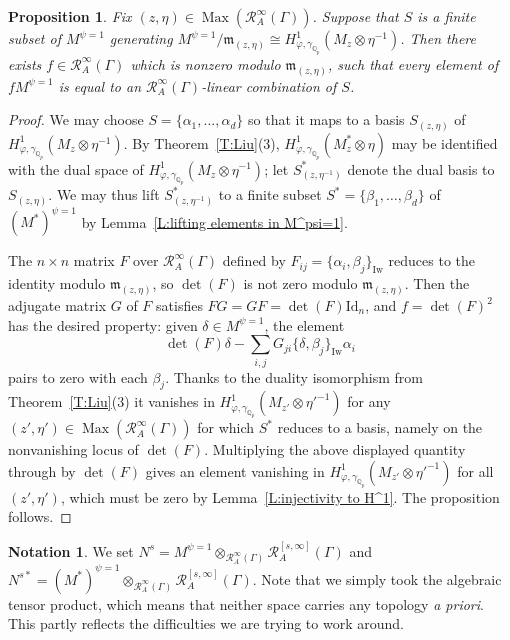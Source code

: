 \documentclass[12pt]{article}
\newtheorem{prop}[theorem]{Proposition}
\theoremstyle{definition}
\newtheorem{notation}[theorem]{Notation}
\numberwithin{equation}{theorem}
\newcommand{\calR}{\mathcal{R}}
\newcommand{\gothm}{\mathfrak{m}}
\newcommand{\QQ}{\mathbb{Q}}
\newcommand{\Iw}{\mathrm{Iw}}
\def\Qp{\QQ_p}
\DeclareMathOperator{\Max}{Max}
\begin{document}
\begin{prop} 
\label{P:generators nearby}
Fix $(z, \eta) \in \Max(\calR_A^\infty(\Gamma))$.
Suppose that $S$ is a finite subset of $M^{\psi=1}$ generating $M^{\psi=1}/\gothm_{(z,\eta)} \cong H^1_{\varphi, \gamma_{\Qp}}(M_z \otimes \eta^{-1})$.
Then there exists $f \in \calR_A^\infty(\Gamma)$ which is nonzero modulo $\gothm_{(z, \eta)}$,
such that every element of $f M^{\psi=1}$ is equal to an $\calR_A^\infty(\Gamma)$-linear combination of $S$.
\end{prop}
\begin{proof}
We may choose $S = \{\alpha_1, \dots,\alpha_d\}$ so that it maps to a
basis $S_{(z, \eta)}$ of $H^1_{\varphi, \gamma_{\Qp}}(M_z \otimes
\eta^{-1})$.  By Theorem~\ref{T:Liu}(3), $H^1_{\varphi,
  \gamma_{\Qp}}(M^*_z \otimes \eta)$ may be identified with the dual
space of $H^1_{\varphi, \gamma_{\Qp}}(M_z \otimes \eta^{-1})$; let
$S_{(z, \eta^{-1})}^*$ denote the dual basis to $S_{(z, \eta)}$.  We
may thus lift $S_{(z, \eta^{-1})}^*$ to a finite subset $S^* =
\{\beta_1, \dots, \beta_d\}$ of $(M^*)^{\psi=1}$ by
Lemma~\ref{L:lifting elements in M^psi=1}.

The $n \times n$ matrix $F$ over $\calR_A^\infty(\Gamma)$ defined by
$F_{ij} = \{ \alpha_i, \beta_j \}_\Iw$ reduces to the identity modulo
$\gothm_{(z, \eta)}$, so $\det(F)$ is not zero modulo $\gothm_{(z,
  \eta)}$.  Then the adjugate matrix $G$ of $F$ satisfies $FG = GF =
\det(F) \mathrm{Id}_n$, and $f = \det(F)^2$ has the desired property:
given $\delta \in M^{\psi=1}$, the element
\[
\det(F) \delta - \sum_{i,j} G_{ji} \{ \delta, \beta_j \}_\Iw \alpha_i
\]
pairs to zero with each $\beta_j$.  Thanks to the duality isomorphism
from Theorem~\ref{T:Liu}(3) it vanishes in $H^1_{\varphi,
  \gamma_{\Qp}}(M_{z'} \otimes \eta'^{-1})$ for any $(z', \eta') \in
\Max(\calR_A^\infty(\Gamma))$ for which $S^*$ reduces to a basis,
namely on the nonvanishing locus of $\det(F)$.  Multiplying the above
displayed quantity through by $\det(F)$ gives an element vanishing in
$H^1_{\varphi, \gamma_{\Qp}}(M_{z'} \otimes \eta'^{-1})$ for all $(z',
\eta')$, which must be zero by Lemma~\ref{L:injectivity to H^1}. The
proposition follows.
\end{proof}


\begin{notation}
We set $N^s = M^{\psi=1} \otimes_{\calR_A^\infty(\Gamma)} \calR_A^{[s,\infty]}(\Gamma)$ and $N^{s*} = (M^*)^{\psi=1} \otimes_{\calR_A^\infty(\Gamma)} \calR_A^{[s,\infty]}(\Gamma)$.
Note that we simply took the algebraic tensor product, which means that neither space carries any topology \textit{a priori}.  This partly reflects the difficulties we are trying to work around.
\end{notation}
\end{document}
